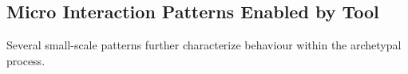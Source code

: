     
    

\subsection{Micro Interaction Patterns Enabled by Tool} 
Several small-scale  patterns further characterize behaviour within the archetypal process.



